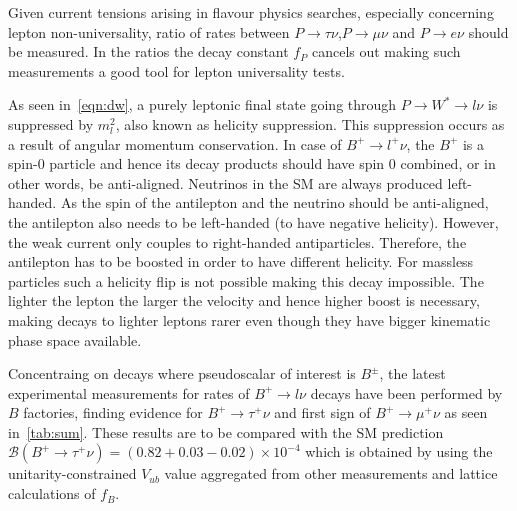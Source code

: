 Given current tensions arising in flavour physics searches, especially concerning lepton non-universality, ratio of rates between $P\rightarrow\tau\nu$,$P\rightarrow\mu\nu$ and $P\rightarrow e\nu$ should be measured. In the ratios the decay constant $f_{P}$ cancels out making such measurements a good tool for lepton universality tests.

As seen in~\autoref{eqn:dw}, a purely leptonic final state going through $P\rightarrow W^{*}\rightarrow l \nu$ is suppressed by $m^{2}_{l}$, also known as helicity suppression. This suppression occurs as a result of angular momentum conservation. In case of $B^{+}\rightarrow l^{+} \nu$, the $B^{+}$ is a spin-0 particle and hence its decay products should have spin 0 combined, or in other words, be anti-aligned. Neutrinos in the \gls{SM} are always produced left-handed. As the spin of the antilepton and the neutrino should be anti-aligned, the antilepton also needs to be left-handed (to have negative helicity). However, the weak current only couples to right-handed antiparticles. Therefore, the antilepton has to be boosted in order to have different helicity. For massless particles such a helicity flip is not possible making this decay impossible. The lighter the lepton the larger the velocity and hence higher boost is necessary, making decays to lighter leptons rarer even though they have bigger kinematic phase space available.

Concentraing on decays where pseudoscalar of interest is $B^{\pm}$, the latest experimental measurements for rates of $B^{+}\rightarrow l \nu$ decays have been performed by $B$ factories, finding evidence for $B^{+}\rightarrow \tau^{+}\nu$ and first sign of $B^{+}\rightarrow \mu^{+}\nu$ as seen in~\autoref{tab:sum}. These results are to be compared with the \gls{SM} prediction $\mathcal{B}(B^{+}\rightarrow \tau^{+}\nu) = (0.82+0.03-0.02)\times10^{-4}$\cite{Charles:2004jd} which is obtained by using the unitarity-constrained $V_{ub}$ value aggregated from other measurements and lattice calculations of $f_{B}$. %


